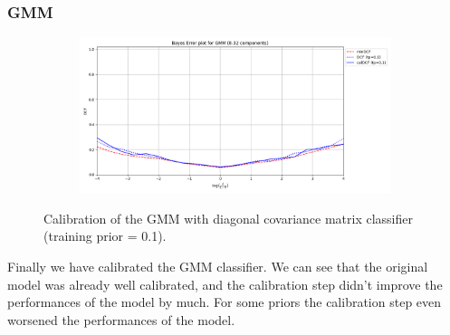 \documentclass[12pt]{report}
\begin{document}
\subsubsection*{GMM}
\begin{figure}[H]
    \centering
    \begin{subfigure}[t]{0.6\textwidth}
        \includegraphics[width=\textwidth]{./plot/calibration/GMM.png}
    \end{subfigure}
    \caption{Calibration of the GMM with diagonal covariance matrix classifier (training prior = 0.1).}
    \label{fig:calibration_GMM}
\end{figure}
\noindent
Finally we have calibrated the GMM classifier. We can see that the original model was already well calibrated, and the calibration step didn't improve the performances of the model by much. For some priors the calibration step even worsened the performances of the model.
\end{document}
